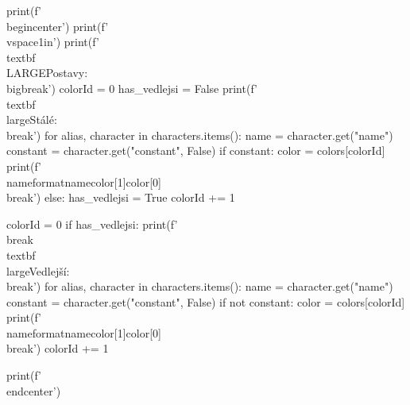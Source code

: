 \begin{pycode}
print(f'\\begin{{center}}')
print(f'\\vspace{{1in}}')
print(f'\\textbf{{\\LARGE{{Postavy:}}}} \\bigbreak')
colorId = 0
has_vedlejsi = False
print(f'\\textbf{{\\large{{Stálé:}}}} \\break')
for alias, character in characters.items():
    name = character.get("name")
    constant = character.get("constant", False)
    if constant:
        color = colors[colorId]
        print(f'\\nameformat{{{name}}}{{{color[1]}}}{{{color[0]}}} \\break')
    else:
        has_vedlejsi = True
    colorId += 1


colorId = 0
if has_vedlejsi:
    print(f'\\break \\textbf{{\\large{{Vedlejší:}}}} \\break')
for alias, character in characters.items():
    name = character.get("name")
    constant = character.get("constant", False)
    if not constant:
        color = colors[colorId]
        print(f'\\nameformat{{{name}}}{{{color[1]}}}{{{color[0]}}} \\break')
    colorId += 1

print(f'\\end{{center}}')
\end{pycode}